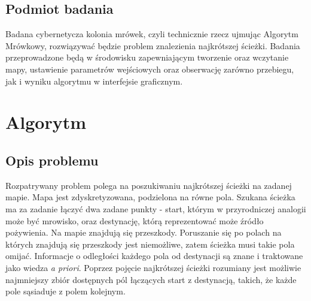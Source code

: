 \documentclass[printmode, openany, oneside, eng]{mgr}
\begin{document}
\section{Podmiot badania}\label{sec:wstepPodmioti}
Badana cybernetycza kolonia mrówek, czyli technicznie rzecz ujmując Algorytm Mrówkowy, rozwiązywać będzie problem znalezienia najkrótszej ścieżki. Badania przeprowadzone będą w środowisku zapewniającym tworzenie oraz wczytanie mapy, ustawienie parametrów wejściowych oraz obserwację zarówno przebiegu, jak i wyniku algorytmu w interfejsie graficznym.





\chapter{Algorytm} \label{chap:algorytm}

\section{Opis problemu}\label{sec:algOpisProbl}
Rozpatrywany problem polega na poszukiwaniu najkrótszej ścieżki na zadanej mapie. Mapa jest zdyskretyzowana, podzielona na równe pola. Szukana ścieżka ma za zadanie łączyć dwa zadane punkty - start, którym w przyrodniczej analogii może być mrowisko, oraz destynację, którą reprezentować może źródło pożywienia. Na mapie znajdują się przeszkody. Poruszanie się po polach na których znajdują się przeszkody jest niemożliwe, zatem ścieżka musi takie pola omijać. Informacje o odległości każdego pola od destynacji są znane i traktowane jako wiedza \textit{a priori}.
\newline Poprzez pojęcie najkrótszej ścieżki rozumiany jest możliwie najmniejszy zbiór dostępnych pól łączących start z destynacją, takich, że każde pole sąsiaduje z polem kolejnym. 
 
\end{document}
